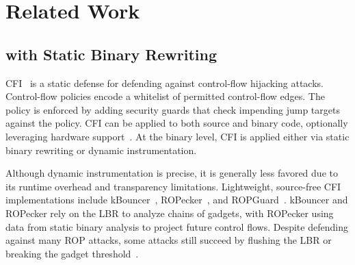 \section{Related Work}


\subsection{\cfi with Static Binary Rewriting}\label{sec:cfi_related}
CFI~\cite{abadi_cfi,burow2017survey} is a static defense for defending against control-flow hijacking attacks.
Control-flow policies encode a whitelist of permitted control-flow edges.
The policy is enforced by adding security guards that check impending jump targets against the policy.
CFI can be applied to both source and binary code, optionally leveraging hardware support~\cite{ptcfi,ptcfi2}.
At the binary level, CFI is applied either via static binary rewriting or dynamic instrumentation.

Although dynamic instrumentation is precise, it is generally less favored due to its runtime overhead and transparency limitations.
Lightweight, source-free CFI implementations include kBouncer~\cite{kbouncer}, ROPecker~\cite{ropecker}, and ROPGuard~\cite{ropguard}. kBouncer and ROPecker rely on the LBR to analyze chains of gadgets, with ROPecker using data from static binary analysis to project future control flows.
Despite defending against many ROP attacks, some attacks still succeed by flushing the LBR or breaking the gadget threshold~\cite{coarse_cfi}.

